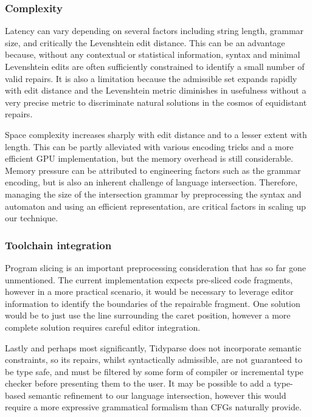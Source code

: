 \documentclass[sigplan,acmsmall,nonacm,screen]{acmart}\settopmatter{printfolios=false,printccs=false,printacmref=false}
\begin{document}
\subsubsection{Complexity}

Latency can vary depending on several factors including string length, grammar size, and critically the Levenshtein edit distance. This can be an advantage because, without any contextual or statistical information, syntax and minimal Levenshtein edits are often sufficiently constrained to identify a small number of valid repairs. It is also a limitation because the admissible set expands rapidly with edit distance and the Levenshtein metric diminishes in usefulness without a very precise metric to discriminate natural solutions in the cosmos of equidistant repairs.

Space complexity increases sharply with edit distance and to a lesser extent with length. This can be partly alleviated with various encoding tricks and a more efficient GPU implementation, but the memory overhead is still considerable. Memory pressure can be attributed to engineering factors such as the grammar encoding, but is also an inherent challenge of language intersection. Therefore, managing the size of the intersection grammar by preprocessing the syntax and automaton and using an efficient representation, are critical factors in scaling up our technique.

\subsubsection{Toolchain integration}

Program slicing is an important preprocessing consideration that has so far gone unmentioned. The current implementation expects pre-sliced code fragments, however in a more practical scenario, it would be necessary to leverage editor information to identify the boundaries of the repairable fragment. One solution would be to just use the line surrounding the caret position, however a more complete solution requires careful editor integration.

Lastly and perhaps most significantly, Tidyparse does not incorporate semantic constraints, so its repairs, whilst syntactically admissible, are not guaranteed to be type safe, and must be filtered by some form of compiler or incremental type checker before presenting them to the user. It may be possible to add a type-based semantic refinement to our language intersection, however this would require a more expressive grammatical formalism than CFGs naturally provide.
\end{document}
